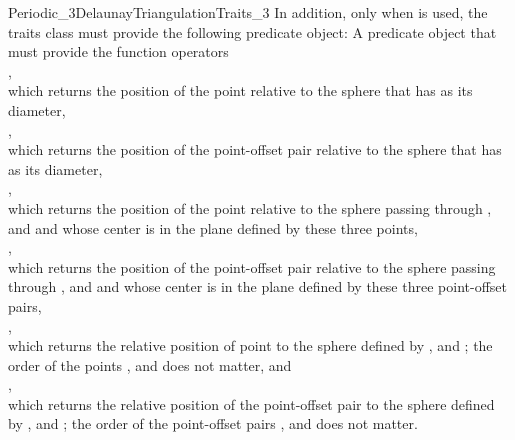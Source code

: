 \begin{ccRefConcept}{Periodic_3DelaunayTriangulationTraits_3}
In addition, only when  is used, the traits class must
provide the following predicate object:
{A predicate object that must provide the function operators\\
,\\
which returns the position of the point  relative to the sphere
that has  as its diameter,\\
,\\
which returns the position of the point-offset pair 
relative to the sphere that has  as its diameter,\\
,\\
which returns the position of the point  relative to the sphere
passing through , and  and whose center is in the
plane defined by these three points,\\
,\\
which returns the position of the point-offset pair 
relative to the sphere passing through , and
 and whose center is in the plane defined by these three
point-offset pairs,\\
,\\
which returns the relative position of point  to the sphere
defined by , and ; the order of the points , and  does not matter, and\\
,\\
which returns the relative position of the point-offset pair
 to the sphere defined by , and ; the order of the point-offset pairs
, and  does not matter.
 } 



\end{ccRefConcept}
